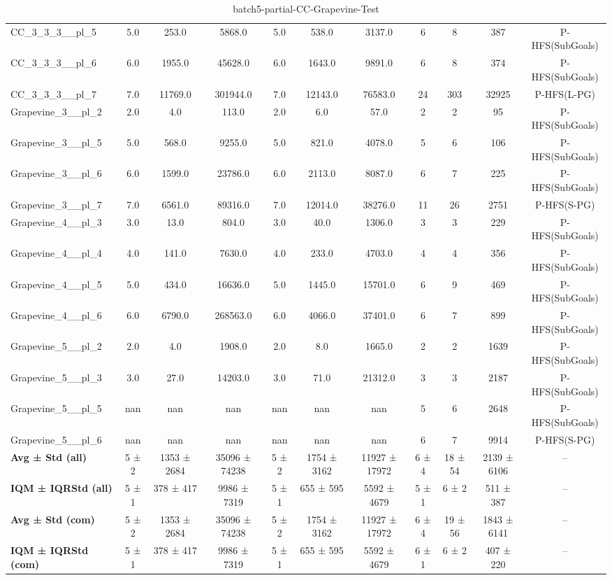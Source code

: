 \begin{table}[!ht]
\begin{tabular}{l|ccc|ccc|cccc}
CC\_3\_3\_3\_\_pl\_5 & 5.0 & 253.0 & 5868.0 & 5.0 & 538.0 & 3137.0 & 6 & 8 & 387 & P-HFS(SubGoals) \\
CC\_3\_3\_3\_\_pl\_6 & 6.0 & 1955.0 & 45628.0 & 6.0 & 1643.0 & 9891.0 & 6 & 8 & 374 & P-HFS(SubGoals) \\
CC\_3\_3\_3\_\_pl\_7 & 7.0 & 11769.0 & 301944.0 & 7.0 & 12143.0 & 76583.0 & 24 & 303 & 32925 & P-HFS(L-PG) \\
Grapevine\_3\_\_pl\_2 & 2.0 & 4.0 & 113.0 & 2.0 & 6.0 & 57.0 & 2 & 2 & 95 & P-HFS(SubGoals) \\
Grapevine\_3\_\_pl\_5 & 5.0 & 568.0 & 9255.0 & 5.0 & 821.0 & 4078.0 & 5 & 6 & 106 & P-HFS(SubGoals) \\
Grapevine\_3\_\_pl\_6 & 6.0 & 1599.0 & 23786.0 & 6.0 & 2113.0 & 8087.0 & 6 & 7 & 225 & P-HFS(SubGoals) \\
Grapevine\_3\_\_pl\_7 & 7.0 & 6561.0 & 89316.0 & 7.0 & 12014.0 & 38276.0 & 11 & 26 & 2751 & P-HFS(S-PG) \\
Grapevine\_4\_\_pl\_3 & 3.0 & 13.0 & 804.0 & 3.0 & 40.0 & 1306.0 & 3 & 3 & 229 & P-HFS(SubGoals) \\
Grapevine\_4\_\_pl\_4 & 4.0 & 141.0 & 7630.0 & 4.0 & 233.0 & 4703.0 & 4 & 4 & 356 & P-HFS(SubGoals) \\
Grapevine\_4\_\_pl\_5 & 5.0 & 434.0 & 16636.0 & 5.0 & 1445.0 & 15701.0 & 6 & 9 & 469 & P-HFS(SubGoals) \\
Grapevine\_4\_\_pl\_6 & 6.0 & 6790.0 & 268563.0 & 6.0 & 4066.0 & 37401.0 & 6 & 7 & 899 & P-HFS(SubGoals) \\
Grapevine\_5\_\_pl\_2 & 2.0 & 4.0 & 1908.0 & 2.0 & 8.0 & 1665.0 & 2 & 2 & 1639 & P-HFS(SubGoals) \\
Grapevine\_5\_\_pl\_3 & 3.0 & 27.0 & 14203.0 & 3.0 & 71.0 & 21312.0 & 3 & 3 & 2187 & P-HFS(SubGoals) \\
Grapevine\_5\_\_pl\_5 & nan & nan & nan & nan & nan & nan & 5 & 6 & 2648 & P-HFS(SubGoals) \\
Grapevine\_5\_\_pl\_6 & nan & nan & nan & nan & nan & nan & 6 & 7 & 9914 & P-HFS(S-PG) \\
\hline
\textbf{Avg ± Std (all)} & 5 ± 2 & 1353 ± 2684 & 35096 ± 74238 & 5 ± 2 & 1754 ± 3162 & 11927 ± 17972 & 6 ± 4 & 18 ± 54 & 2139 ± 6106 & -- \\
\textbf{IQM ± IQRStd (all)} & 5 ± 1 & 378 ± 417 & 9986 ± 7319 & 5 ± 1 & 655 ± 595 & 5592 ± 4679 & 5 ± 1 & 6 ± 2 & 511 ± 387 & -- \\
\textbf{Avg ± Std (com)} & 5 ± 2 & 1353 ± 2684 & 35096 ± 74238 & 5 ± 2 & 1754 ± 3162 & 11927 ± 17972 & 6 ± 4 & 19 ± 56 & 1843 ± 6141 & -- \\
\textbf{IQM ± IQRStd (com)} & 5 ± 1 & 378 ± 417 & 9986 ± 7319 & 5 ± 1 & 655 ± 595 & 5592 ± 4679 & 6 ± 1 & 6 ± 2 & 407 ± 220 & -- \\
\end{tabular}
\caption{batch5-partial-CC-Grapevine-Test}
\label{tab:batch5_partial_CC-Grapevine_comparison_test}
\end{table}